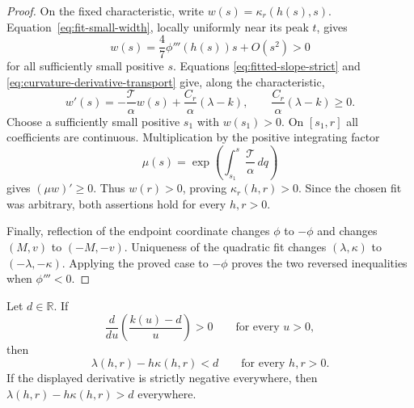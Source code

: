 \begin{proof}
On the fixed characteristic, write
$w(s)=\kappa_r(h(s),s)$.  Equation~\eqref{eq:fit-small-width},
locally uniformly near its peak $t$, gives
\[
 w(s)=\frac47\phi'''(h(s))s+O(s^2)>0
\]
for all sufficiently small positive $s$.  Equations
\eqref{eq:fitted-slope-strict} and
\eqref{eq:curvature-derivative-transport} give, along the
characteristic,
\[
 w'(s)=-\frac{\mathcal T}{\alpha}w(s)
              +\frac{C_r}{\alpha}(\lambda-k),
 \qquad \frac{C_r}{\alpha}(\lambda-k)\ge0.
\]
Choose a sufficiently small positive $s_1$ with $w(s_1)>0$.  On
$[s_1,r]$ all coefficients are continuous.  Multiplication by the
positive integrating factor
\[
 \mu(s)=\exp\left(\int_{s_1}^s\frac{\mathcal T}{\alpha}\,dq\right)
\]
gives $(\mu w)'\ge0$.  Thus $w(r)>0$, proving $\kappa_r(h,r)>0$.
Since the chosen fit was arbitrary, both assertions hold for every
$h,r>0$.

Finally, reflection of the endpoint coordinate changes $\phi$ to
$-\phi$ and changes $(M,v)$ to $(-M,-v)$.  Uniqueness of the quadratic
fit changes $(\lambda,\kappa)$ to $(-\lambda,-\kappa)$.  Applying the
proved case to $-\phi$ proves the two reversed inequalities when
$\phi'''<0$.
\end{proof}

\begin{proposition}\label{prop:intercept}
Let $d\in\mathbb R$.  If
\[
 \frac{d}{du}\left(\frac{k(u)-d}{u}\right)>0
 \qquad\text{for every }u>0,
\]
then
\[
 \lambda(h,r)-h\kappa(h,r)<d
 \qquad\text{for every }h,r>0.
\]
If the displayed derivative is strictly negative everywhere, then
$\lambda(h,r)-h\kappa(h,r)>d$ everywhere.
\end{proposition}

